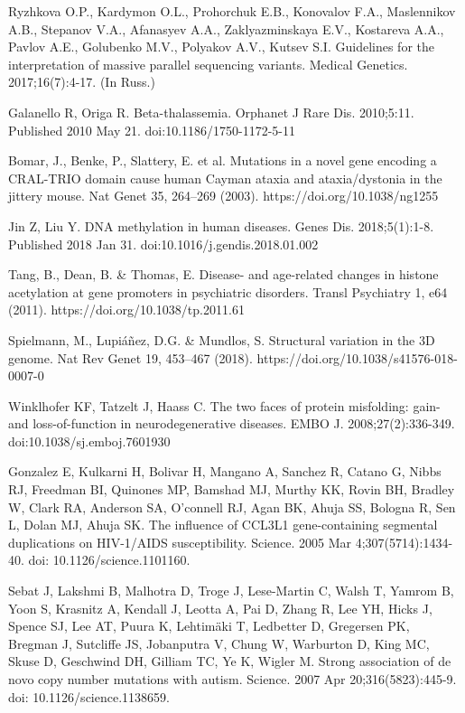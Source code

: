 \documentclass[a4paper,12pt]{article}
\begin{document}
\begin{thebibliography}{300}
Ryzhkova O.P., Kardymon O.L., Prohorchuk E.B., Konovalov F.A., Maslennikov A.B., Stepanov V.A., Afanasyev A.A., Zaklyazminskaya E.V., Kostareva A.A., Pavlov A.E., Golubenko M.V., Polyakov A.V., Kutsev S.I. Guidelines for the interpretation of massive parallel sequencing variants. Medical Genetics. 2017;16(7):4-17. (In Russ.) 

Galanello R, Origa R. Beta-thalassemia. Orphanet J Rare Dis. 2010;5:11. Published 2010 May 21. doi:10.1186/1750-1172-5-11

Bomar, J., Benke, P., Slattery, E. et al. Mutations in a novel gene encoding a CRAL-TRIO domain cause human Cayman ataxia and ataxia/dystonia in the jittery mouse. Nat Genet 35, 264–269 (2003). https://doi.org/10.1038/ng1255

Jin Z, Liu Y. DNA methylation in human diseases. Genes Dis. 2018;5(1):1-8. Published 2018 Jan 31. doi:10.1016/j.gendis.2018.01.002

Tang, B., Dean, B. \& Thomas, E. Disease- and age-related changes in histone acetylation at gene promoters in psychiatric disorders. Transl Psychiatry 1, e64 (2011). https://doi.org/10.1038/tp.2011.61

Spielmann, M., Lupiáñez, D.G. \& Mundlos, S. Structural variation in the 3D genome. Nat Rev Genet 19, 453–467 (2018). https://doi.org/10.1038/s41576-018-0007-0

Winklhofer KF, Tatzelt J, Haass C. The two faces of protein misfolding: gain- and loss-of-function in neurodegenerative diseases. EMBO J. 2008;27(2):336-349. doi:10.1038/sj.emboj.7601930

Gonzalez E, Kulkarni H, Bolivar H, Mangano A, Sanchez R, Catano G, Nibbs RJ, Freedman BI, Quinones MP, Bamshad MJ, Murthy KK, Rovin BH, Bradley W, Clark RA, Anderson SA, O'connell RJ, Agan BK, Ahuja SS, Bologna R, Sen L, Dolan MJ, Ahuja SK. The influence of CCL3L1 gene-containing segmental duplications on HIV-1/AIDS susceptibility. Science. 2005 Mar 4;307(5714):1434-40. doi: 10.1126/science.1101160.

Sebat J, Lakshmi B, Malhotra D, Troge J, Lese-Martin C, Walsh T, Yamrom B, Yoon S, Krasnitz A, Kendall J, Leotta A, Pai D, Zhang R, Lee YH, Hicks J, Spence SJ, Lee AT, Puura K, Lehtimäki T, Ledbetter D, Gregersen PK, Bregman J, Sutcliffe JS, Jobanputra V, Chung W, Warburton D, King MC, Skuse D, Geschwind DH, Gilliam TC, Ye K, Wigler M. Strong association of de novo copy number mutations with autism. Science. 2007 Apr 20;316(5823):445-9. doi: 10.1126/science.1138659.


\end{thebibliography}
\end{document}
